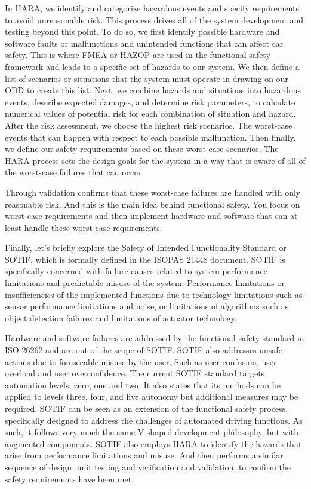  In HARA, we identify and categorize hazardous events and specify requirements to avoid unreasonable risk. 
 This process drives all of the system development and testing beyond this point. To do so, we first identify possible hardware and software 
 faults or malfunctions and unintended functions that can affect car safety. 
 This is where FMEA or HAZOP are used in the functional safety framework and leads to a specific set of hazards to our system. 
 We then define a list of scenarios or situations that the system must operate in drawing on our ODD to create this list. 
 Next, we combine hazards and situations into hazardous events, describe expected damages, and determine risk parameters, to calculate 
 numerical values of potential risk for each combination of situation and hazard. 
 After the risk assessment, we choose the highest risk scenarios. 
 The worst-case events that can happen with respect to each possible malfunction. 
 Then finally, we define our safety requirements based on these worst-case scenarios. 
 The HARA process sets the design goals for the system in a way that is aware of all of the worst-case failures that can occur. 
 
 Through validation confirms that these worst-case failures are handled with only reasonable risk. 
 And this is the main idea behind functional safety. You focus on worst-case requirements and then implement hardware and software that can at least 
 handle these worst-case requirements. 
 
 Finally, let's briefly explore the Safety of Intended Functionality Standard or SOTIF, which is formally defined in the ISOPAS 21448 document. 
 SOTIF is specifically concerned with failure causes related to system performance limitations and predictable misuse of the system. 
 Performance limitations or insufficiencies of the implemented functions due to technology limitations such as 
 sensor performance limitations and noise, or limitations of algorithms such as 
 object detection failures and limitations of actuator technology. 
 
 Hardware and software failures are addressed by the functional safety standard in ISO 26262 and are out of the scope of SOTIF. 
 SOTIF also addresses unsafe actions due to foreseeable misuse by the user. Such as user confusion, user overload and user overconfidence. 
 The current SOTIF standard targets automation levels, zero, one and two. It also states that its methods can be applied to levels three, four, and five autonomy 
 but additional measures may be required. SOTIF can be seen as an extension of the functional safety process, specifically designed to address the challenges of 
 automated driving functions. As such, it follows very much the same V-shaped development philosophy, but with augmented components. 
 SOTIF also employs HARA to identify the hazards that arise from performance limitations and misuse. 
 And then performs a similar sequence of design, unit testing and verification and validation, to confirm 
 the safety requirements have been met. 
 
